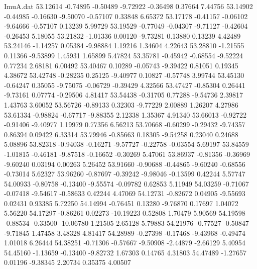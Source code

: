 \begin{filecontents}{ImuA.dat}
  53.12614   -0.74895   -0.50489   -9.72922   -0.36498    0.37664    7.44756
  53.14902   -0.44985   -0.16630   -9.50070   -0.57107    0.33848    6.65372
  53.17178   -0.41157   -0.06102   -9.64666   -0.57107    0.13239    5.99729
  53.19529   -0.77049   -0.04307   -9.71127   -0.42604   -0.26453    5.18055
  53.21832   -1.01336    0.00120   -9.73281    0.13880    0.13239    4.42489
  53.24146   -1.14257    0.05384   -9.98884    1.19216    1.34604    4.22643
  53.28810   -1.21555    0.11366   -9.53899    1.45931    1.65899    5.47824
  53.35781   -0.45942   -0.68554   -9.52224    0.77234    2.68181    6.00492
  53.40467    0.10289   -0.05743   -9.39422    0.81051    0.19345    4.38672
  53.42748   -0.28235    0.25125   -9.40977    0.10827   -0.57748    3.99744
  53.45130   -0.64247    0.35055   -9.75075   -0.06729   -0.39429    4.32566
  53.47427   -0.85304    0.26441   -9.73161    0.07774   -0.29506    4.81417
  53.54438   -0.31705    0.77288   -9.54736    2.39817    1.43763    3.60052
  53.56726   -0.89133    0.32303   -9.77229    2.00889    1.26207    4.27986
  53.61334   -0.98824   -0.67717   -9.88355    2.12338    1.35367    4.91340
  53.66013   -0.92722   -0.91406   -9.40977    1.19979    0.77356    6.56213
  53.70668   -0.60299   -0.29432   -9.74357    0.86394    0.09422    6.33314
  53.79946   -0.85663    0.18305   -9.54258    0.23040    0.24688    5.08896
  53.82318   -0.94038   -0.16271   -9.57727   -0.22758   -0.03554    5.69197
  53.84559   -1.01815   -0.46181   -9.87518   -0.16652   -0.30269    5.47061
  53.86937   -0.81356   -0.36969   -9.60240    0.03194    0.00263    5.26452
  53.91660   -0.90688   -0.44865   -9.60240   -0.68556   -0.73014    5.62327
  53.96260   -0.87697   -0.39242   -9.98046   -0.13599    0.42244    5.57747
  54.00933   -0.80758   -0.13400   -9.55574   -0.09782    0.62853    5.11949
  54.03259   -0.71067   -0.07418   -9.54617   -0.58633    0.42244    4.47069
  54.12731   -0.82672    0.04905   -9.55693    0.02431    0.93385    5.72250
  54.14994   -0.76451    0.13280   -9.76870    0.17697    1.04072    5.56220
  54.17297   -0.86261    0.02273  -10.19223    0.52808    1.70479    5.90569
  54.19598   -0.88534   -0.33500  -10.06780    1.21505    2.65128    5.79883
  54.21976   -0.77527   -0.50847   -9.71845    1.47458    3.48328    4.81417
  54.28989   -0.27398   -0.17468   -9.43968   -0.49474    1.01018    6.26444
  54.38251   -0.71306   -0.57667   -9.50908   -2.44879   -2.66129    5.40954
  54.45160   -1.13659   -0.13400   -9.82732    1.67303    0.14765    4.31803
  54.47489   -1.27657    0.01196   -9.38345    2.20734    0.35375    4.00507

\end{filecontents}
